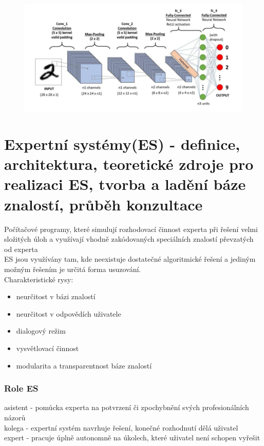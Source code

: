 \begin{figure}[H]
    \includegraphics[scale = 1]{images/konvoluce.png}    
\end{figure}
\newpage

\section{Expertní systémy(ES) - definice, architektura, teoretické zdroje pro realizaci ES, tvorba a ladění báze znalostí, průběh konzultace}
Počítačové programy, které simulují rozhodovací činnost experta při řešení velmi složitých úloh a využívají vhodně zakódovaných speciálních znalostí převzatých od experta\\
ES jsou využívány tam, kde neexistuje dostatečné algoritmické řešení a jediným možným řešením je určitá forma usuzování.\\
Charakteristické rysy:
\begin{itemize}
    \item neurčitost v bázi znalostí
    \item neurčitost v odpovědích uživatele
    \item dialogový režim
    \item vysvětlovací činnost
    \item modularita a transparentnost báze znalostí
\end{itemize}

\subsubsection*{Role ES}
asistent - pomůcka experta na potvrzení či zpochybnění svých profesionálních názorů\\
kolega - expertní systém navrhuje řešení, konečné rozhodnutí dělá uživatel\\
expert - pracuje úplně autonomně na úkolech, které uživatel není schopen vyřešit\\
\newpage
